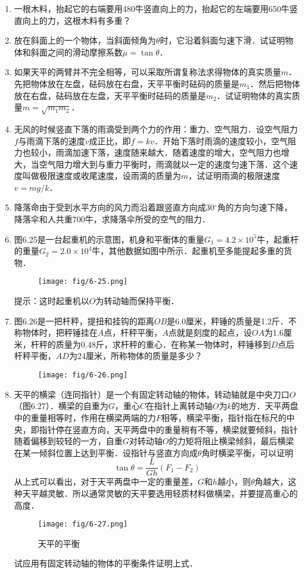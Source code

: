 \begin{enumerate}
\item 一根木料，抬起它的右端要用480牛竖直向上的力，抬起它的左端要用650牛竖直向上的力，这根木料有多重？
\item 放在斜面上的一个物体，当斜面倾角为$\theta$时，它沿着斜面匀速下滑．试证明物体和斜面之间的滑动摩擦系数$\mu=\tan \theta$．
\item 如果天平的两臂并不完全相等，可以采取所谓复称法求得物体的真实质量$m$．先把物体放在左盘，砝码放在右盘，天平平衡时砝码的质量是$m_1$．然后把物体放在右盘，砝码放在左盘，天平平衡时砝码的质量是$m_2$．试证明物体的真实质量$m=\sqrt{m_1m_2}$．
\item 无风的时候竖直下落的雨滴受到两个力的作用：重力、空气阻力．设空气阻力$f$与雨滴下落的速度$v$成正比，即$f=kv$．开始下落时雨滴的速度较小，空气阻力也较小，雨滴加速下落，速度随来越大．随着速度的增大，空气阻力也增大，当空气阻力增大到与重力平衡时，雨滴就以一定的速度匀速下落．这个速度叫做极限速度或收尾速度，设雨滴的质量为$m$，试证明雨滴的极限速度$v=mg/k$．
\item 降落命由于受到水平方向的风力而沿着跟竖直方向成30$^\circ$角的方向匀速下降，降落伞和人共重700牛，求降落伞所受的空气的阻力．
\item 图6.25是一台起重机的示意图，机身和平衡体的重量$G_1=4.2\times 10^5$牛，起重杆的重量$G_2=2.0\times 10^4$牛，其他数据如图中所示．起重机至多能提起多重的货物．
\begin{figure}[htp]
\centering\texttt{[image: fig/6-25.png]}
\caption{}
\end{figure}
提示：这时起重机以$O$为转动轴而保持平衡．

\item  图6.26是一把杆秤，提扭和挂钩的距离$OB$是6.0厘米，秤锤的质量是1.2斤．不称物体时，把秤锤挂在$A$点，杆秤平衡，$A$点就是刻度的起点，设$OA$为1.6厘米，杆秤的质量为0.48斤，求杆秤的重心．在称某一物体时，秤锤移到$D$点后杆秤平衡，$AD$为24厘米，所称物体的质量是多少？
\begin{figure}[htp]
\centering\texttt{[image: fig/6-26.png]}
\caption{}
\end{figure}
\item 天平的横梁（连同指针）是一个有固定转动轴的物体，转动轴就是中央刀口$O$（图6.27）．横梁的自重为$G$，重心$C$在指针上离转动轴$O$为$k$的地方．天平两盘中的重量相等时，作用在横梁两端的力$F$相等，横梁平衡，指针指在标尺的中央，即指针停在竖直方向，天平两盘中的重量稍有不等，横梁就要倾斜，指针随着偏移到较轻的一方，自重$G$对转动轴$O$的力矩将阻止横梁倾斜，最后横梁在某一倾斜位置上达到平衡．设指针与竖直方向成$\theta$角时横梁平衡，可以证明
\[\tan\theta =\frac{L}{Gh}(F_1-F_2) \]
从上式可以看出，对于天平两盘中一定的重量差，$G$和$h$越小，则$\theta$角越大，这种天平越灵敏．所以通常灵敏的天平要选用轻质材料做横梁，并要提高重心的高度．
\begin{figure}[htp]
\centering\texttt{[image: fig/6-27.png]}
\caption{天平的平衡}
\end{figure}
试应用有固定转动轴的物体的平衡条件证明上式．


\end{enumerate}
